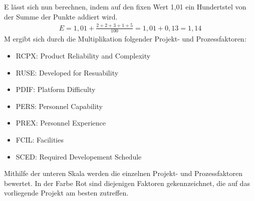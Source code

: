 \documentclass[../review_3.tex]{subfiles}
\begin{document}
E lässt sich nun berechnen, indem auf den fixen Wert 1,01  ein Hundertstel von der Summe der Punkte addiert wird.
\begin{align*}
    E = 1,01 + \frac{2+2+3+1+5}{100}= 1,01 + 0,13 = 1,14
\end{align*}
M ergibt sich durch die Multiplikation folgender Projekt- und Prozessfaktoren:
\begin{itemize}
    \setlength\itemsep{-1mm}
    \item RCPX: Product Reliability and Complexity
    \item RUSE: Developed for Resuability
    \item PDIF: Platform Difficulty
    \item PERS: Personnel Capability
    \item PREX: Personnel Experience
    \item FCIL: Facilities
    \item SCED: Required Developement Schedule
\end{itemize}
Mithilfe der unteren Skala werden die einzelnen Projekt- und Prozessfaktoren bewertet. In der Farbe Rot sind diejenigen Faktoren gekennzeichnet, die auf das vorliegende Projekt am besten zutreffen.
\end{document}
